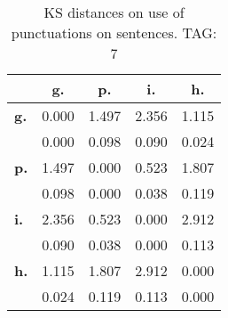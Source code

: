 \begin{table}[h!]
\begin{center}
\begin{tabular}{| l || c | c | c | c |}\hline
 & {\bf g.} & {\bf p.} & {\bf i.} & {\bf h.} \\\hline\hline
{\bf g.} & 0.000 & 1.497 & 2.356 & 1.115 \\
{\bf } & 0.000 & 0.098 & 0.090 & 0.024 \\\hline
{\bf p.} & 1.497 & 0.000 & 0.523 & 1.807 \\
{\bf } & 0.098 & 0.000 & 0.038 & 0.119 \\\hline
{\bf i.} & 2.356 & 0.523 & 0.000 & 2.912 \\
{\bf } & 0.090 & 0.038 & 0.000 & 0.113 \\\hline
{\bf h.} & 1.115 & 1.807 & 2.912 & 0.000 \\
{\bf } & 0.024 & 0.119 & 0.113 & 0.000 \\\hline
\end{tabular}
\caption{KS distances on use of punctuations on sentences. TAG: 7}
\end{center}
\end{table}
